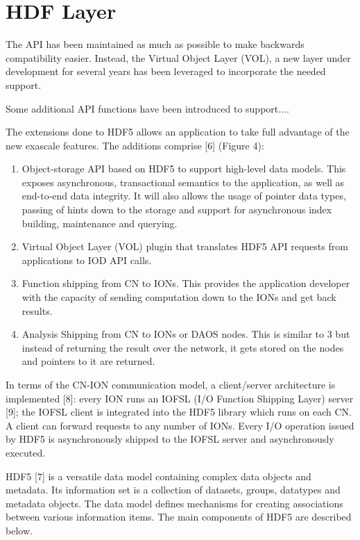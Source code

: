 \documentclass[conference]{IEEEtran}
\begin{document}
\section{HDF Layer}
The API has been maintained as much as possible to make backwards compatibility
easier. Instead, the Virtual Object Layer (VOL), a new layer under development
for several years has been leveraged to incorporate the needed support.

Some additional API functions have been introduced to support....

The extensions done to HDF5 allows an application to take full advantage
of the new exascale features. The additions comprise {[}6{]} (Figure 4):

\begin{enumerate}
\def\labelenumi{\arabic{enumi}.}
\itemsep1pt\parskip0pt
\item
  Object-storage API based on HDF5 to support high-level data models.
  This exposes asynchronous, transactional semantics to the application,
  as well as end-to-end data integrity. It will also allows the usage of
  pointer data types, passing of hints down to the storage and support
  for asynchronous index building, maintenance and querying.
\item
  Virtual Object Layer (VOL) plugin that translates HDF5 API requests
  from applications to IOD API calls.
\item
  Function shipping from CN to IONs. This provides the application
  developer with the capacity of sending computation down to the IONs
  and get back results.
\item
  Analysis Shipping from CN to IONs or DAOS nodes. This is similar to 3
  but instead of returning the result over the network, it gets stored
  on the nodes and pointers to it are returned.
\end{enumerate}

In terms of the CN-ION communication model, a client/server architecture
is implemented {[}8{]}: every ION runs an IOFSL (I/O Function Shipping
Layer) server {[}9{]}; the IOFSL client is integrated into the HDF5
library which runs on each CN. A client can forward requests to any
number of IONs. Every I/O operation issued by HDF5 is asynchronously
shipped to the IOFSL server and asynchronously executed.

HDF5 {[}7{]} is a versatile data model containing complex data objects
and metadata. Its information set is a collection of datasets, groups,
datatypes and metadata objects. The data model defines mechanisms for
creating associations between various information items. The main
components of HDF5 are described below.
\end{document}
